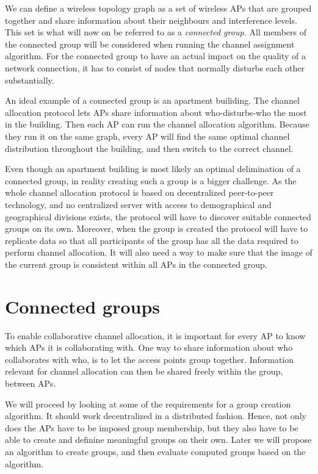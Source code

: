 \documentclass[a4paper,UKenglish]{report}
\begin{document}
We can define a wireless topology graph as a set of wireless APs that are grouped together and share information about their neighbours and interference levels.
This set is what will now on be referred to as a \textit{connected group.} All members of the connected group will be considered when running the channel assignment algorithm.
For the connected group to have an actual impact on the quality of a network connection, it has to consist of nodes that normally disturbs each other substantially.

An ideal example of a connected group is an apartment builiding. The channel allocation protocol lets APs share information about who-disturbs-who the most in the building.
Then each AP can run the channel allocation algorithm. Because they run it on the same graph, every AP will find the same optimal channel distribution throughout the building,
and then switch to the correct channel. 

Even though an apartment building is most likely an optimal delimination of a connected group, in reality creating such a group is a bigger challenge. As the whole channel allocation
protocol is based on decentralized peer-to-peer technology, and no centralized server with access to demographical and geographical divisions exists, the protocol will
have to discover suitable connected groups on its own. Moreover, when the group is created the protocol will have to replicate data so that
all participants of the group has all the data required to perform channel allocation. It will also need a way to make sure that the image of the current group
is consistent within all APs in the connected group. 
\chapter{Connected groups}
To enable collaborative channel allocation, it is important for every AP to know which APs it is collaborating with.
One way to share information about who collaborates with who, is to let the access points group together. Information relevant for channel
allocation can then be shared freely within the group, between APs.

We will proceed by looking at some of the requirements for a group creation algorithm. It should work decentralized in a distributed fashion.
Hence, not only does the APs have to be imposed group membership, but they also have to be able to create and definine meaningful groups on their own.
Later we will propose an algorithm to create groups, and then evaluate computed groups based on the algorithm.
\end{document}
